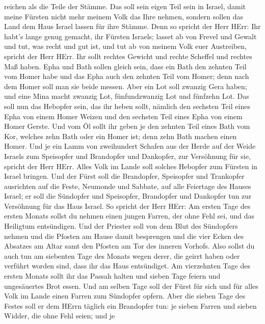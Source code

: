 reichen als die Teile der Stämme.  Das soll sein eigen Teil
sein in Israel, damit meine Fürsten nicht mehr meinem Volk das Ihre
nehmen, sondern sollen das Land dem Haus Israel lassen für ihre Stämme.
 Denn so spricht der Herr HErr: Ihr habt's lange genug
gemacht, ihr Fürsten Israels; lasset ab von Frevel und Gewalt und tut,
was recht und gut ist, und tut ab von meinem Volk euer Austreiben,
spricht der Herr HErr.  Ihr sollt rechtes Gewicht und
rechte Scheffel und rechtes Maß haben.  Epha und Bath
sollen gleich sein, dass ein Bath den zehnten Teil vom Homer habe und
das Epha auch den zehnten Teil vom Homer; denn nach dem Homer soll man
sie beide messen.  Aber ein Lot soll zwanzig Gera haben;
und eine Mina macht zwanzig Lot, fünfundzwanzig Lot und fünfzehn Lot.
 Das soll nun das Hebopfer sein, das ihr heben sollt,
nämlich den sechsten Teil eines Epha von einem Homer Weizen und den
sechsten Teil eines Epha von einem Homer Gerste.  Und vom
Öl sollt ihr geben je den zehnten Teil eines Bath vom Kor, welches zehn
Bath oder ein Homer ist; denn zehn Bath machen einen Homer.
 Und je ein Lamm von zweihundert Schafen aus der Herde auf
der Weide Israels zum Speisopfer und Brandopfer und Dankopfer, zur
Versöhnung für sie, spricht der Herr HErr.  Alles Volk im
Lande soll solches Hebopfer zum Fürsten in Israel bringen. 
Und der Fürst soll die Brandopfer, Speisopfer und Trankopfer ausrichten
auf die Feste, Neumonde und Sabbate, auf alle Feiertage des Hauses
Israel; er soll die Sündopfer und Speisopfer, Brandopfer und Dankopfer
tun zur Versöhnung für das Haus Israel.  So spricht der
Herr HErr: Am ersten Tage des ersten Monats sollst du nehmen einen
jungen Farren, der ohne Fehl sei, und das Heiligtum entsündigen.
 Und der Priester soll von dem Blut des Sündopfers nehmen
und die Pfosten am Hause damit besprengen und die vier Ecken des
Absatzes am Altar samt den Pfosten am Tor des inneren Vorhofs.
 Also sollst du auch tun am siebenten Tage des Monats wegen
derer, die geirrt haben oder verführt worden sind, dass ihr das Haus
entsündiget.  Am vierzehnten Tage des ersten Monats sollt
ihr das Passah halten und sieben Tage feiern und ungesäuertes Brot
essen.  Und am selben Tage soll der Fürst für sich und für
alles Volk im Lande einen Farren zum Sündopfer opfern. 
Aber die sieben Tage des Festes soll er dem HErrn täglich ein Brandopfer
tun: je sieben Farren und sieben Widder, die ohne Fehl seien; und je
